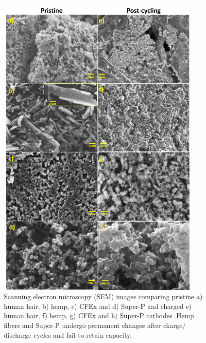 \begin{figure}[h!]
  \centering
  \includegraphics[width=0.9\textwidth]{Figures/chap5fig/SEM}
    \caption{Scanning electron microscopy (SEM) images comparing pristine a) human hair, b) hemp, c) CFEx and d) Super-P and charged e) human hair, f) hemp, g) CFEx and h) Super-P cathodes. Hemp fibers and Super-P undergo permanent changes after charge/ discharge cycles and fail to retain capacity.}
  \label{Figures/chap5fig:SEM}
\end{figure}

